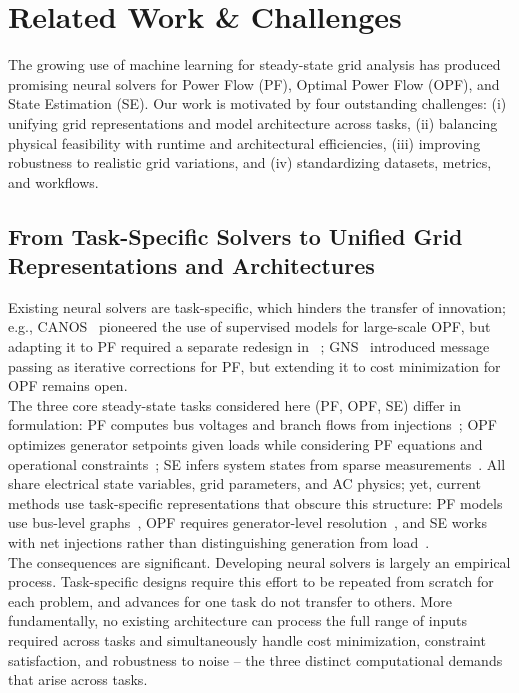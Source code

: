 \section{Related Work \& Challenges}

\label{sec:related}

The growing use of machine learning for steady-state grid analysis has produced promising neural solvers for Power Flow (PF), Optimal Power Flow (OPF), and State Estimation (SE). Our work is motivated by four outstanding challenges: (i) unifying grid representations and model architecture across tasks, (ii) balancing physical feasibility with runtime and architectural efficiencies, (iii) improving robustness to realistic grid variations, and (iv) standardizing datasets, metrics, and workflows.

\subsection{From Task-Specific Solvers to Unified Grid Representations and Architectures}

Existing neural solvers are task-specific, which hinders the transfer of innovation; e.g., CANOS~\cite{piloto2024} pioneered the use of supervised models for large-scale OPF, but adapting it to PF required a separate redesign in \pfdelta~\cite{NEURIPS2025_d000ef56}; GNS~\cite{DONON2020106547} introduced message passing as iterative corrections for PF, but extending it to cost minimization for OPF remains open.\\

The three core steady-state tasks considered here (PF, OPF, SE) differ in formulation: PF computes bus voltages and branch flows from injections~\cite{4499318}; OPF optimizes generator setpoints given loads while considering PF equations and operational constraints~\cite{pandya2008,low2014, cain2012}; SE infers system states from sparse measurements~\cite{abur2004power}. All share electrical state variables, grid parameters, and AC physics; yet, current methods use task-specific representations that obscure this structure: PF models use bus-level graphs~\cite{powermodels, lin2024powerflownet}, OPF requires generator-level resolution~\cite{piloto2024}, and SE works with net injections rather than distinguishing generation from load~\cite{10408467}.\\

The consequences are significant. Developing neural solvers is largely an empirical process. Task-specific designs require this effort to be repeated from scratch for each problem, and advances for one task do not transfer to others. More fundamentally, no existing architecture can process the full range of inputs required across tasks and simultaneously handle cost minimization, constraint satisfaction, and robustness to noise -- the three distinct computational demands that arise across tasks. 

